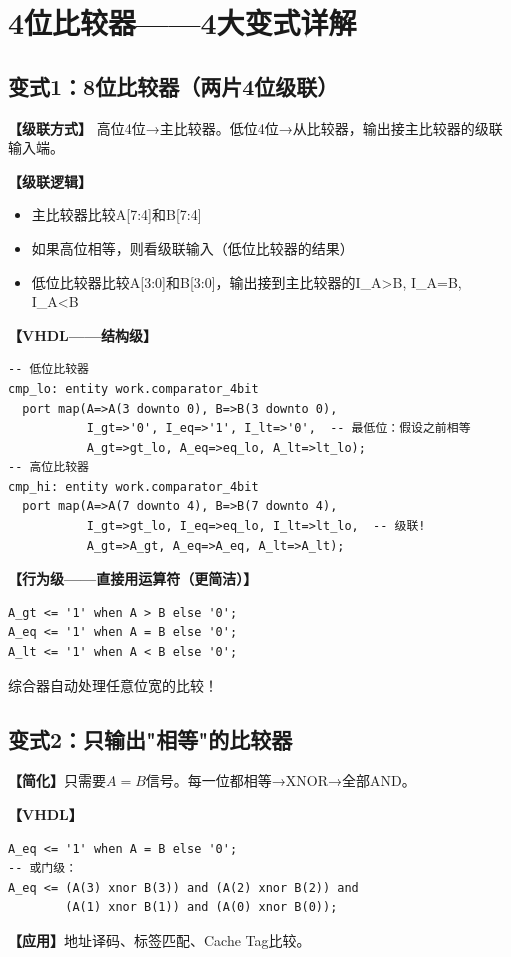 \chapter{4位比较器——4大变式详解}

\section{变式1：8位比较器（两片4位级联）}

\begin{detailbox}[完整教学]
\textbf{【级联方式】}
高位4位→主比较器。低位4位→从比较器，输出接主比较器的级联输入端。

\textbf{【级联逻辑】}
\begin{itemize}
  \item 主比较器比较A[7:4]和B[7:4]
  \item 如果高位相等，则看级联输入（低位比较器的结果）
  \item 低位比较器比较A[3:0]和B[3:0]，输出接到主比较器的I\_A>B, I\_A=B, I\_A<B
\end{itemize}

\textbf{【VHDL——结构级】}
\begin{lstlisting}
-- 低位比较器
cmp_lo: entity work.comparator_4bit
  port map(A=>A(3 downto 0), B=>B(3 downto 0),
           I_gt=>'0', I_eq=>'1', I_lt=>'0',  -- 最低位：假设之前相等
           A_gt=>gt_lo, A_eq=>eq_lo, A_lt=>lt_lo);
-- 高位比较器
cmp_hi: entity work.comparator_4bit
  port map(A=>A(7 downto 4), B=>B(7 downto 4),
           I_gt=>gt_lo, I_eq=>eq_lo, I_lt=>lt_lo,  -- 级联!
           A_gt=>A_gt, A_eq=>A_eq, A_lt=>A_lt);
\end{lstlisting}

\textbf{【行为级——直接用运算符（更简洁）】}
\begin{lstlisting}
A_gt <= '1' when A > B else '0';
A_eq <= '1' when A = B else '0';
A_lt <= '1' when A < B else '0';
\end{lstlisting}
综合器自动处理任意位宽的比较！
\end{detailbox}


\section{变式2：只输出"相等"的比较器}

\begin{detailbox}[完整教学]
\textbf{【简化】}只需要$A=B$信号。每一位都相等→XNOR→全部AND。

\textbf{【VHDL】}
\begin{lstlisting}
A_eq <= '1' when A = B else '0';
-- 或门级：
A_eq <= (A(3) xnor B(3)) and (A(2) xnor B(2)) and
        (A(1) xnor B(1)) and (A(0) xnor B(0));
\end{lstlisting}

\textbf{【应用】}地址译码、标签匹配、Cache Tag比较。
\end{detailbox}


